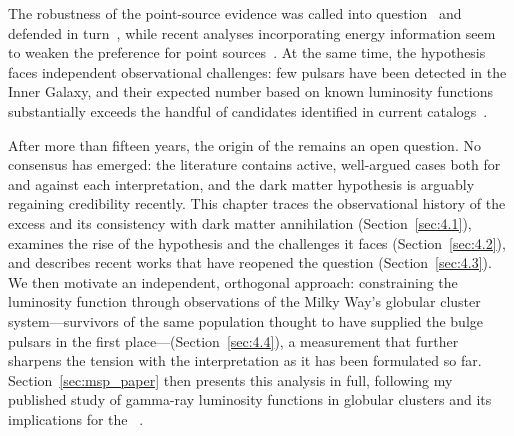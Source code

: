 The robustness of the point-source evidence was called into question~\cite{Leane:2019xiy,Leane:2020pfc} and defended in turn~\cite{Buschmann:2020adf,Calore_2021, Manconi:2025ogr}, while recent analyses incorporating energy information seem to weaken the preference for point sources~\cite{List:2025qbx}.
At the same time, the \MSP hypothesis faces independent observational challenges: few pulsars have been detected in the Inner Galaxy, and their expected number based on known luminosity functions substantially exceeds the handful of candidates identified in current catalogs~\cite{Hooper:2016rap,Holst:2024fvb,Amerio:2024qor}.

After more than fifteen years, the origin of the \GCE remains an open question.
No consensus has emerged: the literature contains active, well-argued cases both for and against each interpretation, and the dark matter hypothesis is arguably regaining credibility recently.
This chapter traces the observational history of the excess and its consistency with dark matter annihilation (Section~\ref{sec:4.1}), examines the rise of the \MSP hypothesis and the challenges it faces (Section~\ref{sec:4.2}), and describes recent works that have reopened the question (Section~\ref{sec:4.3}).
We then motivate an independent, orthogonal approach: constraining the \MSP luminosity function through observations of the Milky Way's globular cluster system---survivors of the same population thought to have supplied the bulge pulsars in the first place---(Section~\ref{sec:4.4}), a measurement that further sharpens the tension with the \MSP interpretation as it has been formulated so far.
Section~\ref{sec:msp_paper} then presents this analysis in full, following my published study of \MSP gamma-ray luminosity functions in globular clusters and its implications for the \GCE~\cite{Amerio:2024qor}.
